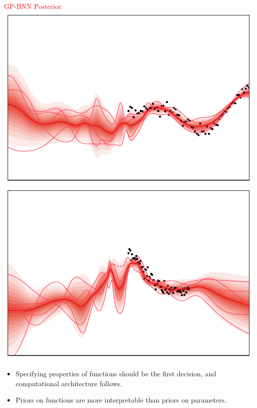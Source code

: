 \documentclass[landscape,a1,final,a4resizeable]{include/a0poster}
\newcommand{\X}{\B X}
\newcommand{\B}[1]{\ensuremath{  \mathbf{#1} } }
\newcommand{\pbnn}{p_{\text{\tiny BNN}}}
\newcommand{\col}[1]{{\color{camLightBlue}\textbf{#1}}}%
\begin{document}
\begin{minipage}[t][0pt]{\linewidth}
\begin{poster}
\begin{multicols}{3}
\begin{minipage}[t][14cm][t]{.3\textwidth}
{\begin{center}
\textcolor{Red}{GP-BNN Posterior}\\
\includegraphics[width=.48\textwidth]{figures/xsinxgppbnn.pdf} 
\includegraphics[width=.48\textwidth]{figures/expxgppbnn.pdf}    
\end{center}


}

\vspace{1cm}

\begin{itemize}
\item Specifying properties of functions should be the first decision, and computational architecture follows.
\item Priors on functions are more interpretable than priors on parameters.
\end{itemize}
\end{minipage}

\end{multicols}
\end{poster}
\end{minipage}
\end{document}
